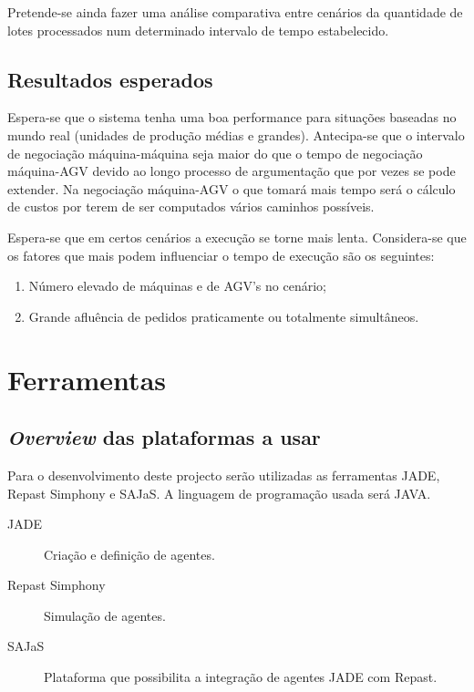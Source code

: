 \begin{titlepage}
Pretende-se ainda fazer uma análise comparativa entre cenários da quantidade de lotes processados num determinado intervalo de tempo estabelecido.

\subsection{Resultados esperados}
\justify\normalsize
Espera-se que o sistema tenha uma boa performance para situações baseadas no mundo real (unidades de produção médias e grandes). Antecipa-se que o intervalo de negociação máquina-máquina seja maior do que o tempo de negociação máquina-AGV devido ao longo processo de argumentação que por vezes se pode extender. Na negociação máquina-AGV o que tomará mais tempo será o cálculo de custos por terem de ser computados vários caminhos possíveis.\newline 

Espera-se que em certos cenários a execução se torne mais lenta. Considera-se que os fatores que mais podem influenciar o tempo de execução são os seguintes:

\begin{enumerate}
\item Número elevado de máquinas e de AGV's no cenário;
\item Grande afluência de pedidos praticamente ou totalmente simultâneos.
\end{enumerate}



\section{Ferramentas}

\subsection{\textit{Overview} das plataformas a usar}
Para o desenvolvimento deste projecto serão utilizadas as ferramentas JADE, Repast Simphony e SAJaS. A linguagem de programação usada será JAVA.

\begin{description}
\item[JADE] Criação e definição de agentes.
\item[Repast Simphony] Simulação de agentes.
\item[SAJaS] Plataforma que possibilita a integração de agentes JADE com Repast.
\end{description}


\end{titlepage}
